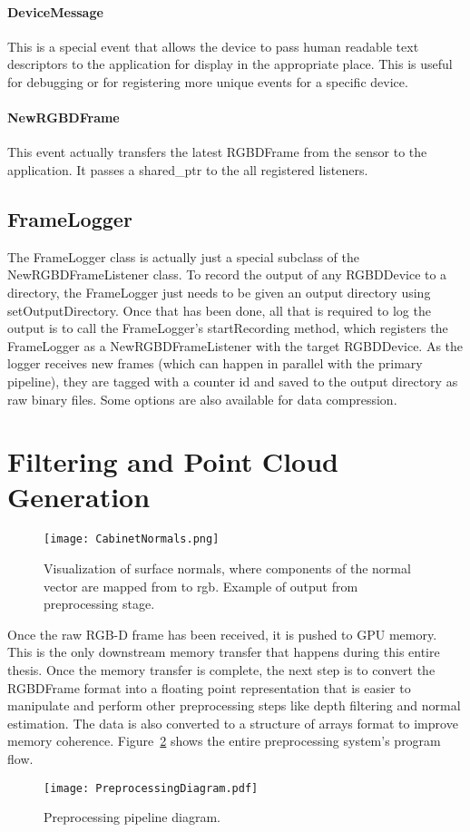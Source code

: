 \paragraph{DeviceMessage}
This is a special event that allows the device to pass human readable text descriptors to the application for display in the appropriate place. This is useful for debugging or for registering more unique events for a specific device.
\paragraph{NewRGBDFrame}
This event actually transfers the latest RGBDFrame from the sensor to the application. It passes a shared\_ptr to the all registered listeners.
\subsection{FrameLogger}
The FrameLogger class is actually just a special subclass of the NewRGBDFrameListener class. To record the output of any RGBDDevice to a directory, the FrameLogger just needs to be given an output directory using setOutputDirectory. Once that has been done, all that is required to log the output is to call the FrameLogger's startRecording method, which registers the FrameLogger as a NewRGBDFrameListener with the target RGBDDevice. As the logger receives new frames (which can happen in parallel with the primary pipeline), they are tagged with a counter id and saved to the output directory as raw binary files. Some options are also available for data compression.


\section{Filtering and Point Cloud Generation}
\begin{figure}[ht]
    \centering
    \texttt{[image: CabinetNormals.png]}
    \caption{Visualization of surface normals, where components of the normal vector are mapped from to rgb. Example of output from preprocessing stage. }
    \label{fig:filteringoutput}
\end{figure}
Once the raw RGB-D frame has been received, it is pushed to GPU memory. This is the only downstream memory transfer that happens during this entire thesis. Once the memory transfer is complete, the next step is to convert the RGBDFrame format into a floating point representation that is easier to manipulate and perform other preprocessing steps like depth filtering and normal estimation. The data is also converted to a structure of arrays format to improve memory coherence. Figure~\ref{fig:preprocessingdiagram} shows the entire preprocessing system's program flow. 
\begin{figure}[hp]
    \centering
    \texttt{[image: PreprocessingDiagram.pdf]}
    \caption{Preprocessing pipeline diagram.}
    \label{fig:preprocessingdiagram}
\end{figure}
